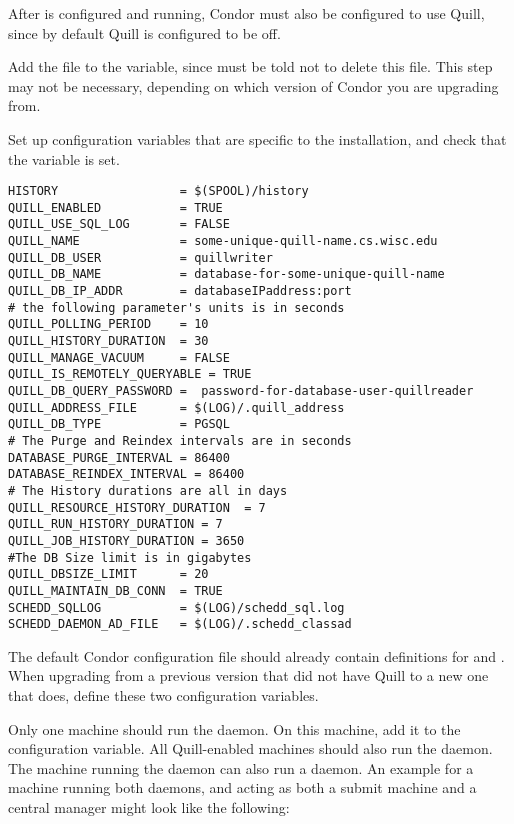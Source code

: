 After  is configured and running, Condor must also be
configured to use Quill, since by default Quill is configured to be off.

\begin{description}
\item Add the file  to the 
   variable, since  must
  be told not to delete this file.
  This step may not be necessary, depending on which version of Condor 
  you are upgrading from. 
 
\item Set up configuration variables that are specific to the installation,
and check that the  variable is set.
\footnotesize
\begin{verbatim}
HISTORY                 = $(SPOOL)/history
QUILL_ENABLED           = TRUE
QUILL_USE_SQL_LOG       = FALSE
QUILL_NAME              = some-unique-quill-name.cs.wisc.edu
QUILL_DB_USER           = quillwriter
QUILL_DB_NAME           = database-for-some-unique-quill-name
QUILL_DB_IP_ADDR        = databaseIPaddress:port
# the following parameter's units is in seconds
QUILL_POLLING_PERIOD    = 10
QUILL_HISTORY_DURATION 	= 30
QUILL_MANAGE_VACUUM     = FALSE
QUILL_IS_REMOTELY_QUERYABLE = TRUE
QUILL_DB_QUERY_PASSWORD =  password-for-database-user-quillreader
QUILL_ADDRESS_FILE      = $(LOG)/.quill_address
QUILL_DB_TYPE           = PGSQL
# The Purge and Reindex intervals are in seconds
DATABASE_PURGE_INTERVAL	= 86400
DATABASE_REINDEX_INTERVAL = 86400
# The History durations are all in days 
QUILL_RESOURCE_HISTORY_DURATION  = 7
QUILL_RUN_HISTORY_DURATION = 7
QUILL_JOB_HISTORY_DURATION = 3650
#The DB Size limit is in gigabytes
QUILL_DBSIZE_LIMIT      = 20
QUILL_MAINTAIN_DB_CONN  = TRUE
SCHEDD_SQLLOG           = $(LOG)/schedd_sql.log
SCHEDD_DAEMON_AD_FILE   = $(LOG)/.schedd_classad

\end{verbatim}
\normalsize

\end{description}

The default Condor configuration file should already contain definitions
for  and .  
When upgrading from a previous version that did not have Quill to
a new one that does, define these two configuration variables.

Only one machine should run the  daemon.  
On this machine, add it to the  configuration variable.
All Quill-enabled machines should also run the  daemon.
The machine running the  daemon can also 
run a  daemon.  An example 
for a machine running both daemons,
and acting as both a submit machine and a central manager might 
look like the following:

